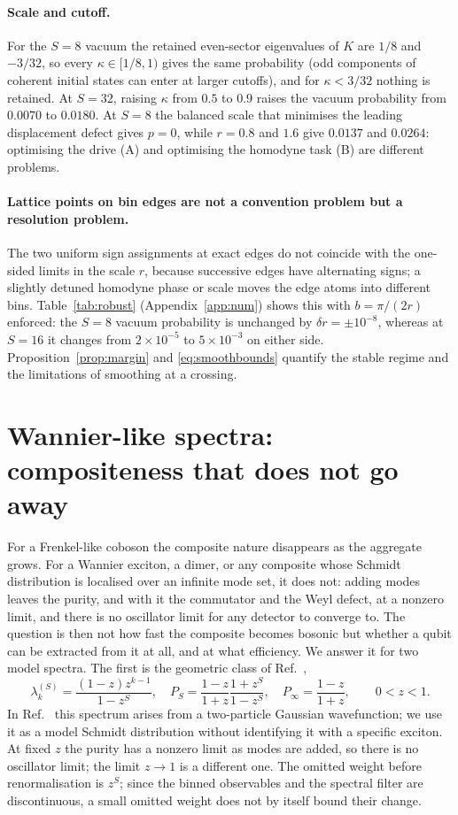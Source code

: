 \documentclass[11pt,a4paper]{article}
\begin{document}
\paragraph{Scale and cutoff.}
For the $S=8$ vacuum the retained even-sector eigenvalues of $K$ are $1/8$ and $-3/32$, so every $\kappa\in[1/8,1)$ gives the same probability (odd components of coherent initial states can enter at larger cutoffs), and for $\kappa<3/32$ nothing is retained. At $S=32$, raising $\kappa$ from $0.5$ to $0.9$ raises the vacuum probability from $0.0070$ to $0.0180$. At $S=8$ the balanced scale that minimises the leading displacement defect gives $p=0$, while $r=0.8$ and $1.6$ give $0.0137$ and $0.0264$: optimising the drive (A) and optimising the homodyne task (B) are different problems.

\paragraph{Lattice points on bin edges are not a convention problem but a resolution problem.}
The two uniform sign assignments at exact edges do not coincide with the one-sided limits in the scale $r$, because successive edges have alternating signs; a slightly detuned homodyne phase or scale moves the edge atoms into different bins. Table~\ref{tab:robust} (Appendix~\ref{app:num}) shows this with $b=\pi/(2r)$ enforced: the $S=8$ vacuum probability is unchanged by $\delta r=\pm10^{-8}$, whereas at $S=16$ it changes from $2\times10^{-5}$ to $5\times10^{-3}$ on either side. Proposition~\ref{prop:margin} and \eqref{eq:smoothbounds} quantify the stable regime and the limitations of smoothing at a crossing.


\section{Wannier-like spectra: compositeness that does not go away}
\label{sec:purity}
For a Frenkel-like coboson the composite nature disappears as the aggregate grows. For a Wannier exciton, a dimer, or any composite whose Schmidt distribution is localised over an infinite mode set, it does not: adding modes leaves the purity, and with it the commutator and the Weyl defect, at a nonzero limit, and there is no oscillator limit for any detector to converge to. The question is then not how fast the composite becomes bosonic but whether a qubit can be extracted from it at all, and at what efficiency. We answer it for two model spectra. The first is the geometric class of Ref.~\cite{Law2005},
\begin{equation}
\lambda_k^{(S)}=\frac{(1-z)z^{k-1}}{1-z^S},\quad
P_S=\frac{1-z}{1+z}\frac{1+z^S}{1-z^S},\quad
P_\infty=\frac{1-z}{1+z},\qquad 0<z<1.
\label{eq:geom}
\end{equation}
In Ref.~\cite{Law2005} this spectrum arises from a two-particle Gaussian wavefunction; we use it as a model Schmidt distribution without identifying it with a specific exciton. At fixed $z$ the purity has a nonzero limit as modes are added, so there is no oscillator limit; the limit $z\to1$ is a different one. The omitted weight before renormalisation is $z^S$; since the binned observables and the spectral filter are discontinuous, a small omitted weight does not by itself bound their change.
\end{document}
